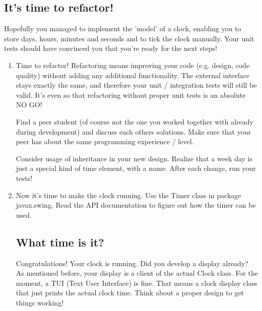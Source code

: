 \begin{multicols}{2}
\subsection*{It's time to refactor!} 

Hopefully you managed to implement the 'model' of a clock, enabling you
to store days, hours, minutes and seconds and to tick the clock manually. Your 
unit tests should have convinced you that you're ready for the next steps!


\begin{enumerate}[label=\Alph*]
\item Time to refactor! Refactoring means improving your code (e.g. design, code quality)
without adding any additional functionality. The external interface stays exactly the 
same, and therefore your unit / integration tests will still be valid. It's even so that 
refactoring without proper unit tests is an absolute NO GO!

Find a peer student (of course not the one you worked together with already during development) 
and discuss each others solutions. Make sure that your peer has about the same
programming experience / level.

Consider usage of inheritance in your new design. Realize that a week day is just
a special kind of time element, with a name. After each change, run your tests!

\item Now it's time to make the clock running. Use the Timer class in package 
javax.swing. Read the API documentation to figure out how the timer can be used.

\subsection*{What time is it?}
Congratulations! Your clock is running. Did you develop a display already? As mentioned
before, your display is a client of the actual Clock class. For the moment, a TUI (Text User 
Interface) is fine. That means a clock display class that just prints the actual clock time.
Think about a proper design to get things working!

\end{enumerate}
\end{multicols}
\Sep
